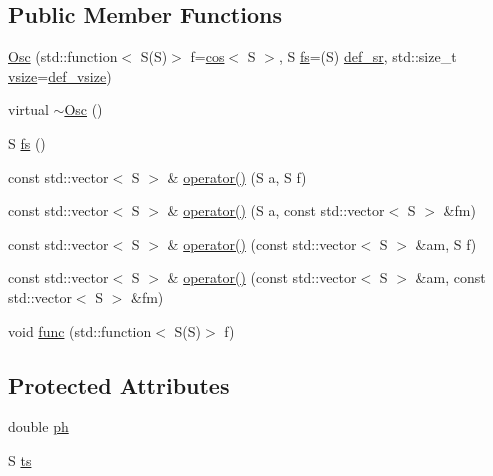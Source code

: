\subsection*{Public Member Functions}
\begin{DoxyCompactItemize}
\item 
\hyperlink{class_aurora_1_1_osc_ac97decabac1a41e2556039548f8feab4}{Osc} (std\+::function$<$ S(S)$>$ f=\hyperlink{namespace_aurora_ab6ef1b966b8f27d107fcabe1027a677a}{cos}$<$ S $>$, S \hyperlink{class_aurora_1_1_osc_a0a156f9d14f246ea4e7b1cf2bcbf2c4c}{fs}=(S) \hyperlink{namespace_aurora_ad49263d809bea98dd422e95bc91bc03e}{def\+\_\+sr}, std\+::size\+\_\+t \hyperlink{class_aurora_1_1_snd_base_ad68387541cc3d696d0cf58d474f94b73}{vsize}=\hyperlink{namespace_aurora_afaaddf667a06e7ce23c667a8b7295263}{def\+\_\+vsize})
\item 
virtual \hyperlink{class_aurora_1_1_osc_a95062ac1670f5de00a27c33bfb4eb117}{$\sim$\+Osc} ()
\item 
S \hyperlink{class_aurora_1_1_osc_a0a156f9d14f246ea4e7b1cf2bcbf2c4c}{fs} ()
\item 
const std\+::vector$<$ S $>$ \& \hyperlink{class_aurora_1_1_osc_a2a36c0afda86b6fabad4ed3ca0f510af}{operator()} (S a, S f)
\item 
const std\+::vector$<$ S $>$ \& \hyperlink{class_aurora_1_1_osc_af48611ef63363221de325d8976a1ec56}{operator()} (S a, const std\+::vector$<$ S $>$ \&fm)
\item 
const std\+::vector$<$ S $>$ \& \hyperlink{class_aurora_1_1_osc_a28fe97e5634b8a02474657ed456c326b}{operator()} (const std\+::vector$<$ S $>$ \&am, S f)
\item 
const std\+::vector$<$ S $>$ \& \hyperlink{class_aurora_1_1_osc_a06f9ead5fbf828f7ebb8617ac6cb24b4}{operator()} (const std\+::vector$<$ S $>$ \&am, const std\+::vector$<$ S $>$ \&fm)
\item 
void \hyperlink{class_aurora_1_1_osc_a1ffdfa0db8932dbaa7cc96e046a6d461}{func} (std\+::function$<$ S(S)$>$ f)
\end{DoxyCompactItemize}
\subsection*{Protected Attributes}
\begin{DoxyCompactItemize}
\item 
double \hyperlink{class_aurora_1_1_osc_ac649d41b585b377b17eeba66a18dbcc2}{ph}
\item 
S \hyperlink{class_aurora_1_1_osc_a2c7ae380eade4eee2e6035856ed0dcbe}{ts}
\end{DoxyCompactItemize}


